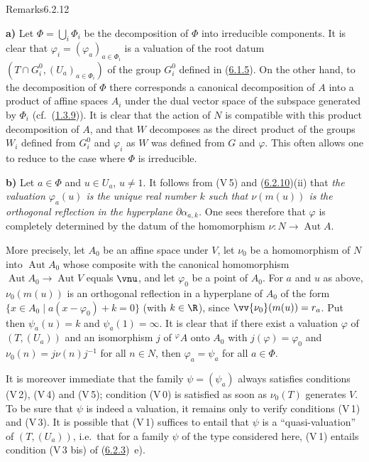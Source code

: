 \documentclass[12pt,a4paper,oneside,english]{smfart}
\makeatletter
\newcommand{\btanchor}[1]{\leavevmode\Hy@raisedlink{\hypertarget{bt:#1}{}}}
\newcommand{\btref}[1]{\hyperlink{bt:#1}{#1}}
\theoremstyle{definition}
\theoremstyle{bt}
\makeatother
\begin{document}
\begin{stmt}{Remarks}{6.2.12}\btanchor{6.2.12}
\end{stmt}
\noindent\textbf{a)} Let $\Phi=\bigcup_i\Phi_i$ be the decomposition of $\Phi$
into irreducible components. It is clear that $\varphi_i=(\varphi_a)_{a\in\Phi_i}$
is a valuation of the root datum $(T\cap G_i^{0},(U_a)_{a\in\Phi_i})$ of the group
$G_i^{0}$ defined in (\btref{6.1.5}). On the other hand, to the decomposition of $\Phi$
there corresponds a canonical decomposition of $A$ into a product of affine spaces
$A_i$ under the dual vector space of the subspace generated by $\Phi_i$
(cf.\ (\btref{1.3.9})). It is clear that the action of $N$ is compatible with this product
decomposition of $A$, and that $W$ decomposes as the direct product of the groups
$W_i$ defined from $G_i^{0}$ and $\varphi_i$ as $W$ was defined from $G$ and
$\varphi$. This often allows one to reduce to the case where $\Phi$ is
irreducible.

\medskip
\noindent\textbf{b)} Let $a\in\Phi$ and $u\in U_a$, $u\ne1$. It follows from
(V\,5) and (\btref{6.2.10})(ii) that \emph{the valuation $\varphi_a(u)$ is the unique real
number $k$ such that $\nu(m(u))$ is the orthogonal reflection in the hyperplane
$\partial\alpha_{a,k}$.} One sees therefore that $\varphi$ is completely determined
by the datum of the homomorphism $\nu:N\to\operatorname{Aut}A$.

More precisely, let $A_0$ be an affine space under $V$, let $\nu_0$ be a
homomorphism of $N$ into $\operatorname{Aut}A_0$ whose composite with the canonical
homomorphism $\operatorname{Aut}A_0\to\operatorname{Aut}V$ equals $\vnu$, and let
$\varphi_0$ be a point of $A_0$. For $a$ and $u$ as above, $\nu_0(m(u))$ is an
orthogonal reflection in a hyperplane of $A_0$ of the form
$\{x\in A_0\mid a(x-\varphi_0)+k=0\}$ (with $k\in\R$), since
$\vv{\nu_0}(m(u))=r_a$. Put then $\psi_a(u)=k$ and $\psi_a(1)=\infty$. It is clear
that if there exist a valuation $\varphi$ of $(T,(U_a))$ and an isomorphism $j$ of
${}^{\varphi}A$ onto $A_0$ with $j(\varphi)=\varphi_0$ and
$\nu_0(n)=j\nu(n)j^{-1}$ for all $n\in N$, then $\varphi_a=\psi_a$ for all
$a\in\Phi$.

It is moreover immediate that the family $\psi=(\psi_a)$ always satisfies
conditions (V\,2), (V\,4) and (V\,5); condition (V\,0) is satisfied as soon as
$\nu_0(T)$ generates $V$. To be sure that $\psi$ is indeed a valuation, it remains
only to verify conditions (V\,1) and (V\,3). It is possible that (V\,1) suffices to
entail that $\psi$ is a ``quasi-valuation'' of $(T,(U_a))$, i.e.\ that for a family
$\psi$ of the type considered here, (V\,1) entails condition (V\,3 bis) of
(\btref{6.2.3})~e).
\end{document}
